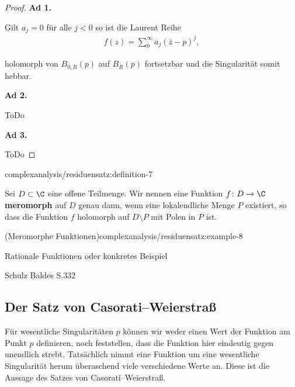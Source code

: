 \documentclass[letterpaper,10pt,german]{jupyterBook}
\begin{document}
\begin{proof}
 \textbf{Ad 1.}

\par
Gilt \(a_j=0\) für alle \(j<0\) so ist die Laurent Reihe
\begin{align*}
f(z) = \sum_{0}^\infty a_j (z-p)^j,
\end{align*}
\par
holomorph von \(B_{0,R}(p)\) auf \(B_R(p)\) fortsetzbar und die Singularität somit hebbar.

\par
\textbf{Ad 2.}

\par
ToDo

\par
\textbf{Ad 3.}

\par
ToDo
\end{proof}
\begin{definition}{}{complexanalysis/residuensatz:definition-7}



\par
Sei \(D \subset \C\) eine offene Teilmenge.
Wir nennen eine Funktion \(f \colon D \rightarrow \C\) \textbf{meromorph} auf \(D\) genau dann, wenn eine lokalendliche Menge \(P\) existiert, so dass die Funktion \(f\) holomorph auf \(D \setminus P\) mit Polen in \(P\) ist.
\end{definition}
\begin{example}{(Meromorphe Funktionen)}{complexanalysis/residuensatz:example-8}



\par
Rationale Funktionen oder konkretes Beispiel

\par
Schulz Baldes S.332
\end{example}


\subsection{Der Satz von Casorati–Weierstraß}
\label{\detokenize{complexanalysis/residuensatz:der-satz-von-casorati-weierstrasz}}
\par
Für wesentliche Singularitäten \(p\) können wir weder einen Wert der Funktion am Punkt \(p\) definieren, noch feststellen, dass die Funktion hier eindeutig gegen unendlich strebt. Tatsächlich nimmt eine Funktion um eine wesentliche Singularität herum überaschend viele verschiedene Werte an. Diese ist die Aussage des Satzes von Casorati–Weierstraß.
\end{document}
